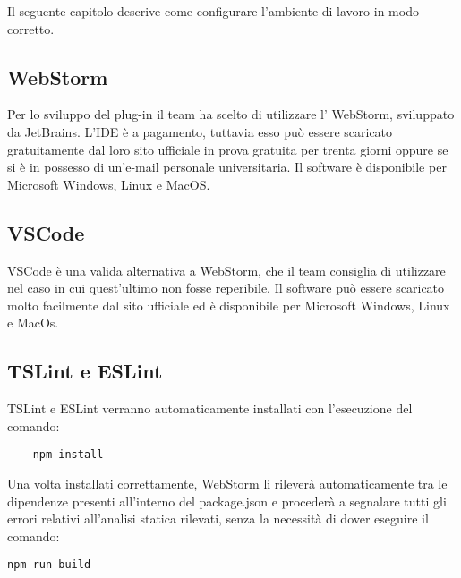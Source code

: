 Il seguente capitolo descrive come configurare l'ambiente di lavoro in modo corretto.

\subsection{WebStorm}
Per lo sviluppo del plug-in il team ha scelto di utilizzare l' WebStorm, sviluppato da JetBrains. L'IDE è a pagamento, tuttavia esso può essere scaricato gratuitamente dal loro sito ufficiale in prova gratuita per trenta giorni oppure se si è in possesso di un'e-mail personale universitaria.
Il software è disponibile per Microsoft Windows, Linux e MacOS.
\subsection{VSCode}
VSCode è una valida alternativa a WebStorm, che il team consiglia di utilizzare nel caso in cui quest'ultimo non fosse reperibile.
Il software può essere scaricato molto facilmente dal sito ufficiale ed è disponibile per Microsoft Windows, Linux e MacOs.
\subsection{TSLint e ESLint}
TSLint e ESLint verranno automaticamente installati con l'esecuzione del comando:
\begin{verbatim}
	npm install
\end{verbatim}
Una volta installati correttamente, WebStorm li rileverà automaticamente tra le dipendenze presenti all'interno del package.json e procederà a segnalare tutti gli errori relativi all'analisi statica rilevati, senza la necessità di dover eseguire il comando:
\begin{verbatim}
npm run build
\end{verbatim}

\pagebreak
